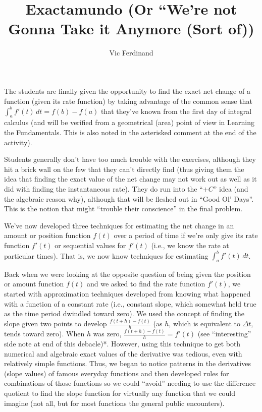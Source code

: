\documentclass{ximera}
\author{Vic Ferdinand}
\title{Exactamundo (Or ``We're not Gonna Take it Anymore (Sort of))}
\begin{document}
\begin{abstract}
\end{abstract}
\maketitle

\begin{instructorIntro}
The students are finally given the opportunity to find the exact net change of a function (given its rate function) by taking advantage of the common sense that $\int_a^b f'(t)\, dt = f(b) - f(a)$ that they've known from the first day of integral calculus (and will be verified from a geometrical (area) point of view in Learning the Fundamentals.  This is also noted in the asterisked comment at the end of the activity).  

Students generally don't have too much trouble with the exercises, although they hit a brick wall on the few that they can't directly find (thus giving them the idea that finding the exact value of the net change may not work out as well as it did with finding the instantaneous rate).  They do run into the ``$+C$'' idea (and the algebraic reason why), although that will be fleshed out in ``Good Ol' Days''.  This is the notion that might “trouble their conscience” in the final problem.

\end{instructorIntro}


We've now developed three techniques for estimating the net change in an amount or position function $f(t)$  over a period of time if we're only give its rate function $f'(t)$ or sequential values for  $f'(t)$ (i.e., we know the rate at particular times).  That is, we now know techniques for estimating  $\int_a^b f'(t) \, dt$.

Back when we were looking at the opposite question of being given the position or amount function $f(t)$ and we asked to find the rate function  $f'(t)$, we started with approximation techniques developed from knowing what happened with a function of a constant rate (i.e., constant slope, which somewhat held true as the time period dwindled toward zero).  We used the concept of finding the slope given two points to develop $\frac{f(t+h) - f(t)}{h}$ (as $h$, which is equivalent to $\Delta t$, tends toward zero).  When $h$ was zero,  $\frac{f(t+h) - f(t)}{h} = f'(t)$ (see ``interesting'' side note at end of this debacle)*.  However, using this technique to get both numerical and algebraic exact values of the derivative was tedious, even with relatively simple functions.  Thus, we began to notice patterns in the derivatives (slope values) of famous everyday functions and then developed rules for combinations of those functions so we could ``avoid'' needing to use the difference quotient to find the slope function for virtually any function that we could imagine (not all, but for most functions the general public encounters).
\end{document}
